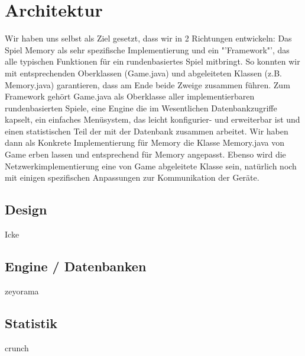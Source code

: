 \documentclass[11pt,a4paper]{article}
\begin{document}


\section {Architektur}
Wir haben uns selbst als Ziel gesetzt, dass wir in 2 Richtungen entwickeln: Das Spiel Memory als sehr spezifische Implementierung und ein "'Framework"', das alle typischen Funktionen für ein rundenbasiertes Spiel mitbringt. So konnten wir mit entsprechenden Oberklassen (Game.java) und abgeleiteten Klassen (z.B. Memory.java) garantieren, dass am Ende beide Zweige zusammen führen.
Zum Framework gehört Game.java als Oberklasse aller implementierbaren rundenbasierten Spiele, eine Engine die im Wesentlichen Datenbankzugriffe kapselt, ein einfaches Menüsystem, das leicht konfigurier- und erweiterbar ist und einen statistischen Teil der mit der Datenbank zusammen arbeitet. Wir haben dann als Konkrete Implementierung für Memory die Klasse Memory.java von Game erben lassen und entsprechend für Memory angepasst. Ebenso wird die Netzwerkimplementierung eine von Game abgeleitete Klasse sein, natürlich noch mit einigen spezifischen Anpassungen zur Kommunikation der Geräte.

\subsection{Design}
Icke
\subsection{Engine / Datenbanken}
zeyorama
\subsection{Statistik}
crunch
\end{document}
